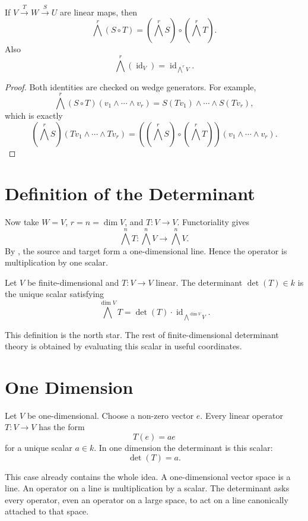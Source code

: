 \documentclass[11pt]{memoir}
\newcommand{\id}{\operatorname{id}}
\begin{document}
\begin{proposition}[functoriality]
\label{prop:wedge-functoriality}
If \(V\xrightarrow{T}W\xrightarrow{S}U\) are linear maps, then
\[
  \bigwedge^r(S\circ T)=(\bigwedge^rS)\circ(\bigwedge^rT).
\]
Also
\[
  \bigwedge^r(\id_V)=\id_{\bigwedge^rV}.
\]
\end{proposition}

\begin{proof}
Both identities are checked on wedge generators. For example,
\[
  \bigwedge^r(S\circ T)(v_1\wedge\cdots\wedge v_r)
  =
  S(Tv_1)\wedge\cdots\wedge S(Tv_r),
\]
which is exactly
\[
  (\bigwedge^rS)(Tv_1\wedge\cdots\wedge Tv_r)
  =
  ((\bigwedge^rS)\circ(\bigwedge^rT))(v_1\wedge\cdots\wedge v_r).
\]
\end{proof}

\section{Definition of the Determinant}
\label{sec:det-definition}

Now take \(W=V\), \(r=n=\dim V\), and \(T:V\to V\). Functoriality
gives
\[
  \bigwedge^nT:\bigwedge^nV\to\bigwedge^nV.
\]
By , the source and target form a
one-dimensional line. Hence the operator is multiplication by one
scalar.

\begin{definition}
\label{def:operator-det}
Let \(V\) be finite-dimensional and \(T:V\to V\) linear. The
determinant \(\det(T)\in k\) is the unique scalar satisfying
\[
  \bigwedge^{\dim V}T
  =
  \det(T)\cdot \id_{\bigwedge^{\dim V}V}.
\]
\end{definition}

This definition is the north star. The rest of finite-dimensional
determinant theory is obtained by evaluating this scalar in useful
coordinates.

\section{One Dimension}
\label{sec:one-dimension}

Let \(V\) be one-dimensional. Choose a non-zero vector \(e\). Every
linear operator \(T:V\to V\) has the form
\[
  T(e)=a e
\]
for a unique scalar \(a\in k\). In one dimension the determinant is
this scalar:
\[
  \det(T)=a.
\]

This case already contains the whole idea. A one-dimensional vector
space is a line. An operator on a line is multiplication by a scalar.
The determinant asks every operator, even an operator on a large
space, to act on a line canonically attached to that space.
\end{document}
